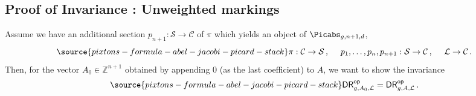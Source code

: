 
\subsection{Proof of Invariance \invnrn{}: {\rm Unweighted markings}}
Assume we have an additional section $p_{n+1}: \mathcal{S} \rightarrow \mathcal{C}$ of $\pi$ which yields an object of $\Picabs_{g,n+1,d}$,
    \begin{equation}
    \label{ff44996}
\source{pixtons-formula-abel-jacobi-picard-stack}
    \pi:\mathcal{C} \rightarrow \mathcal{S}\, , \ \ \ \ p_1,\ldots,p_n,p_{n+1}: \mathcal{S} \rightarrow \mathcal{C}\, , \ \ \ \
        \mathcal{L} \rightarrow \mathcal{C}\, .
        \end{equation}
 Then, for the vector $A_0 \in \mathbb{Z}^{n+1}$ obtained by appending $0$ (as the last coefficient) to $A$, we want to show the invariance
 \begin{equation} \label{eqn:n_invar_repeat}
\source{pixtons-formula-abel-jacobi-picard-stack}
     \mathsf{DR}^{\mathsf{op}}_{g,A_0, \mathcal{L}}
        =\mathsf{DR}^{\mathsf{op}}_{g,A, \mathcal{L}}
        \, .
 \end{equation}



